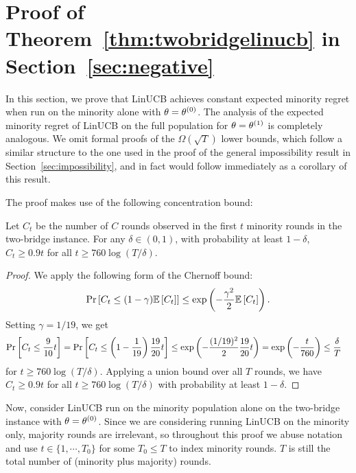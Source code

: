 \section{Proof of Theorem~\ref{thm:twobridgelinucb} in Section~\ref{sec:negative}}

In this section, we prove that LinUCB achieves constant expected
minority regret when run on the minority alone with
$\theta = \theta^{(0)}$. The analysis of the expected minority regret of
LinUCB on the full population for $\theta = \theta^{(1)}$ is completely
analogous. We omit formal proofs of the $\Omega(\sqrt{T})$ lower
bounds, which follow a similar structure to the one used in the proof
of the general impossibility result in
Section~\ref{sec:impossibility}, and in fact would follow immediately
as a corollary of this result.

The proof makes use of the following concentration bound:


\begin{lemma} \label{lem:badrounds}
Let $C_t$ be the number of $C$ rounds observed in the first $t$ minority rounds
in the two-bridge instance. For any $\delta \in (0, 1)$,
with probability at least $1-\delta$, $C_t \ge 0.9t$ for all $t \ge 760 \log
(T/\delta)$.
\end{lemma}
\begin{proof}
We apply the following form of the Chernoff bound:
\[
  \Pr\left[C_t \le (1-\gamma) \mathbb{E}\left[C_t\right]\right] \le \exp\left(-\frac{\gamma^2}{2} \mathbb{E}\left[C_t\right]\right).
\]
Setting $\gamma = 1/19$, we get
\begin{align*}
  \Pr\left[C_t \le \frac{9}{10}t\right] &=
  \Pr\left[C_t \le \left(1 - \frac{1}{19}\right) \frac{19}{20}t\right]
  \le \exp\left(-\frac{(1/19)^2}{2} \frac{19}{20} t\right)
  = \exp\left(-\frac{t}{760}\right)
  \le \frac{\delta}{T}
\end{align*}
for $t \ge 760 \log (T/\delta)$. Applying a union bound over all $T$ rounds, we have $C_t
\ge 0.9t$ for all $t \ge 760 \log(T/\delta)$ with probability at least
$1-\delta$.
\end{proof}

Now, consider LinUCB run on the minority population alone on the
two-bridge instance with $\theta = \theta^{(0)}$. Since we are
considering running LinUCB on the minority only, majority rounds are
irrelevant, so throughout this proof we abuse notation and use
$t \in \{1, \cdots, T_0\}$ for some $T_0 \leq T$ to index minority
rounds. $T$ is still the total number of (minority plus majority)
rounds.

